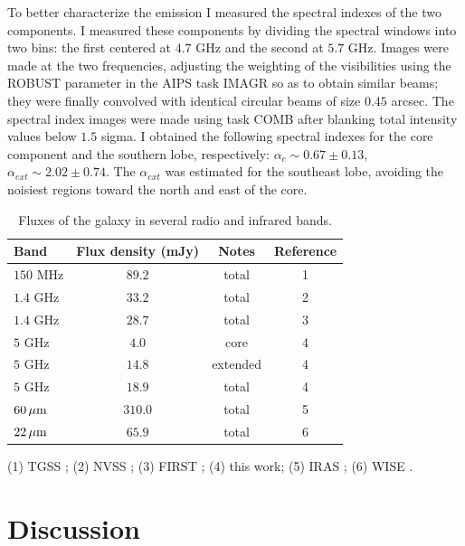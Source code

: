 \documentclass[../thesis.tex]{subfiles}
\begin{document}
To better characterize the emission I measured the spectral indexes of the two components.
I measured these components by dividing the spectral windows into two bins: the first centered at $4.7$ GHz and the second at $5.7$ GHz.
Images were made at the two frequencies, adjusting the weighting of the visibilities using the ROBUST parameter in the AIPS task IMAGR so as to obtain similar beams; they were finally convolved with identical circular beams of size $0.45$ arcsec. 
The spectral index images were made using task COMB after blanking total intensity values below $1.5$ sigma. 
I obtained the following spectral indexes for the core component and the southern lobe, respectively:  $\alpha_{c} \sim 0.67\pm0.13$,  $\alpha_{ext} \sim 2.02\pm0.74$. 
The $\alpha_{ext}$ was estimated for the southeast lobe, avoiding the noisiest regions toward the north and east of the core.


\begin{table}
\centering
  \begin{threeparttable}
\caption{Fluxes of the galaxy in several radio and infrared bands.}
\label{tab:flux}
\begin{tabular}{lccc}
\hline
Band&Flux density (mJy) &Notes &Reference\\
\hline
$150$ MHz&$89.2$&total&1\\
$1.4$ GHz&$33.2$&total&2\\
$1.4$ GHz&$28.7$&total&3\\
$5$ GHz&$4.0$ & core&4\\
$5$ GHz&$14.8$ & extended&4\\
$5$ GHz&$18.9$ & total&4\\
$60{\,\rm \mu m}$& $310.0$& total &5\\
$22{\,\rm \mu m}$& $65.9$ & total& 6\\
\hline
\end{tabular}
\begin{tablenotes}
\item (1) TGSS \citep{Intema17}; (2) NVSS \citep{Condon98}; (3) FIRST \citep{Becker95}; (4) this work; (5) IRAS \citep{Moshir90}; (6) WISE \citep{Wright10}.
\end{tablenotes}
\end{threeparttable}
\end{table}

\section{Discussion}
\label{sec:discussion}
\end{document}
